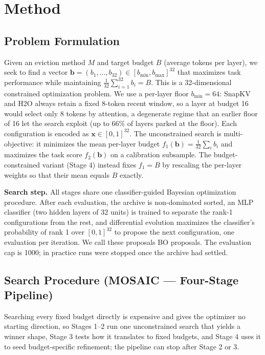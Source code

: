 \documentclass[11pt]{article}
\begin{document}
\section{Method}

\subsection{Problem Formulation}

Given an eviction method $M$ and target budget $B$ (average tokens per layer), we seek to find a vector $\mathbf{b} = (b_1, \ldots, b_{32}) \in [b_{\min}, b_{\max}]^{32}$ that maximizes task performance while maintaining $\frac{1}{32}\sum_{i=1}^{32} b_i = B$. This is a 32-dimensional constrained optimization problem. We use a per-layer floor $b_{\min} = 64$: SnapKV and H2O always retain a fixed 8-token recent window, so a layer at budget 16 would select only 8 tokens by attention, a degenerate regime that an earlier floor of 16 let the search exploit (up to 66\% of layers parked at the floor). Each configuration is encoded as $\mathbf{x} \in [0,1]^{32}$. The unconstrained search is multi-objective: it minimizes the mean per-layer budget $f_1(\mathbf{b}) = \frac{1}{32}\sum_i b_i$ and maximizes the task score $f_2(\mathbf{b})$ on a calibration subsample. The budget-constrained variant (Stage 4) instead fixes $f_1 = B$ by rescaling the per-layer weights so that their mean equals $B$ exactly.

\textbf{Search step.} All stages share one classifier-guided Bayesian optimization procedure. After each evaluation, the archive is non-dominated sorted, an MLP classifier (two hidden layers of 32 units) is trained to separate the rank-1 configurations from the rest, and differential evolution maximizes the classifier's probability of rank 1 over $[0,1]^{32}$ to propose the next configuration, one evaluation per iteration. We call these proposals BO proposals. The evaluation cap is 1000; in practice runs were stopped once the archive had settled.

\subsection{Search Procedure (MOSAIC — Four-Stage Pipeline)}

Searching every fixed budget directly is expensive and gives the optimizer no starting direction, so Stages 1--2 run one unconstrained search that yields a winner shape, Stage 3 tests how it translates to fixed budgets, and Stage 4 uses it to seed budget-specific refinement; the pipeline can stop after Stage 2 or 3.
\end{document}
